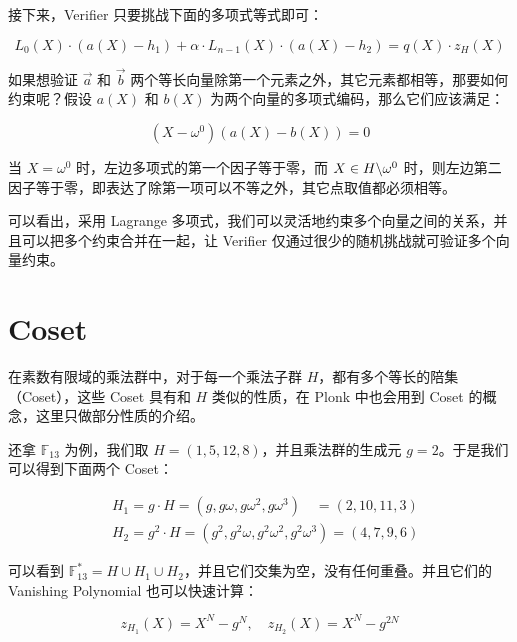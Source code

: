 接下来，Verifier 只要挑战下面的多项式等式即可：

\[
L_0(X)\cdot (a(X)-h_1) + \alpha\cdot L_{n-1}(X)\cdot(a(X)-h_2) = q(X)\cdot z_H(X)
\]

如果想验证 \(\vec{a}\) 和 \(\vec{b}\)
两个等长向量除第一个元素之外，其它元素都相等，那要如何约束呢？假设
\(a(X)\) 和 \(b(X)\) 为两个向量的多项式编码，那么它们应该满足：

\[
(X-\omega^0)(a(X)-b(X))=0
\]

当 \(X=\omega^0\) 时，左边多项式的第一个因子等于零，而
\(X\in H\backslash\\{\omega^0\\}\)
时，则左边第二因子等于零，即表达了除第一项可以不等之外，其它点取值都必须相等。

可以看出，采用 Lagrange
多项式，我们可以灵活地约束多个向量之间的关系，并且可以把多个约束合并在一起，让
Verifier 仅通过很少的随机挑战就可验证多个向量约束。

\hypertarget{coset}{%
\section{Coset}\label{coset}}

在素数有限域的乘法群中，对于每一个乘法子群
\(H\)，都有多个等长的陪集（Coset），这些 Coset 具有和 \(H\)
类似的性质，在 Plonk 中也会用到 Coset 的概念，这里只做部分性质的介绍。

还拿 \(\mathbb{F}_{13}\) 为例，我们取
\(H=(1,5,12,8)\)，并且乘法群的生成元 \(g=2\)。于是我们可以得到下面两个
Coset：

$$
\begin{aligned}
& H_1=g \cdot H=\left(g, g \omega, g \omega^2, g \omega^3\right) \quad=(2,10,11,3) \\
& H_2=g^2 \cdot H=\left(g^2, g^2 \omega, g^2 \omega^2, g^2 \omega^3\right)=(4,7,9,6)
\end{aligned}
$$

可以看到
\(\mathbb{F}^*_{13}=H\cup H_1 \cup H_2\)，并且它们交集为空，没有任何重叠。并且它们的
Vanishing Polynomial 也可以快速计算：

\[
z_{H_1}(X)=X^N-g^N, \quad z_{H_2}(X)=X^N-g^{2N}
\]




